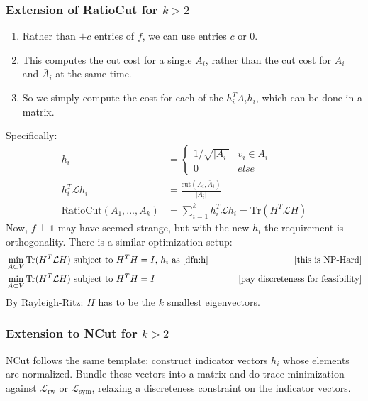 \documentclass{article}
\begin{document}
\subsubsection*{Extension of RatioCut for $k>2$}

\begin{enumerate}
    \item Rather than $\pm c$ entries of $f$, we can use entries $c$ or $0$.
    \item This computes the cut cost for a single $A_i$, rather than the cut cost for $A_i$ and $\bar{A}_i$ at the same time.
    \item So we simply compute the cost for each of the $h_i^T A_i h_i$, which can be done in a matrix.
\end{enumerate}
Specifically:
\begin{align} 
    \label{dfn:h} h_i & = \begin{cases}
        1/\sqrt{|A_i|} & v_i \in A_i \\
        0 & \textit{else}
    \end{cases} \\
    h_i^T \mathcal{L} h_i & = \frac{\text{cut}(A_i, \bar{A}_i)}{|A_i|} \\
    \text{RatioCut}(A_1, ..., A_k) & = \sum_{i=1}^k h_i^T \mathcal{L} h_i = \text{Tr}(H^T \mathcal{L} H)
\end{align}
Now, $f \perp \mathds{1}$ may have seemed strange, but with the new $h_i$ the requirement is orthogonality. There is a similar optimization setup:
\begin{align}
   &\min_{A \subset V} \text{Tr}(H^T \mathcal{L} H) \text{ subject to $H^T H = I$, $h_i$ as \eqref{dfn:h} }  \qquad &\text{[this is NP-Hard]} \\
   &\min_{A \subset V} \text{Tr}(H^T \mathcal{L} H) \text{ subject to $H^T H = I$}  \qquad &\text{[pay discreteness for feasibility]} 
\end{align}
By Rayleigh-Ritz: $H$ has to be the $k$ smallest eigenvectors.

\subsubsection*{Extension to NCut for $k>2$}
NCut follows the same template: construct indicator vectors $h_i$ whose elements are normalized. Bundle these vectors into a matrix and do trace minimization against $\mathcal{L}_{\text{rw}}$ or $\mathcal{L}_{\text{sym}}$, relaxing a discreteness constraint on the indicator vectors.
\end{document}
